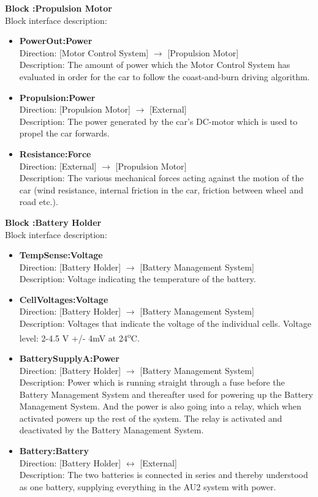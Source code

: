 \textbf{Block :Propulsion Motor}\\
Block interface description:
\begin{itemize}
	\item \textbf{PowerOut:Power}\\
	Direction: [Motor Control System] $\rightarrow$ [Propulsion Motor]\\
	Description: The amount of power which the Motor Control System has evaluated in order for the car to follow the coast-and-burn driving algorithm.
	\item \textbf{Propulsion:Power}\\
	Direction: [Propulsion Motor] $\rightarrow$ [External]\\
	Description: The power generated by the car's DC-motor which is used to propel the car forwards.  
	\item \textbf{Resistance:Force}\\
	Direction: [External] $\rightarrow$ [Propulsion Motor]\\
	Description: The various mechanical forces acting against the motion of the car (wind resistance, internal friction in the car, friction between wheel and road etc.).
\end{itemize}

\textbf{Block :Battery Holder}\\
Block interface description:
\begin{itemize}
	\item \textbf{TempSense:Voltage}\\
	Direction: [Battery Holder] $\rightarrow$ [Battery Management System]\\
	Description: Voltage indicating the temperature of the battery.
	\item \textbf{CellVoltages:Voltage}\\
	Direction: [Battery Holder] $\rightarrow$ [Battery Management System]\\
	Description: Voltages that indicate the voltage of the individual cells.
	Voltage level: 2-4.5 V +/- 4mV at 24\textsuperscript{o}C\cite{BMSDocumentation}. 
	\item \textbf{BatterySupplyA:Power}\\
	Direction: [Battery Holder] $\rightarrow$ [Battery Management System]\\
	Description: Power which is running straight through a fuse before the Battery Management System and thereafter used for powering up the Battery Management System. And the power is also going into a relay, which when activated powers up the rest of the system. The relay is activated and deactivated by the Battery Management System.
	\item \textbf{Battery:Battery}\\
	Direction: [Battery Holder] $\leftrightarrow$ [External]\\
	Description: The two batteries is connected in series and thereby understood as one battery, supplying everything in the AU2 system with power.
\end{itemize}